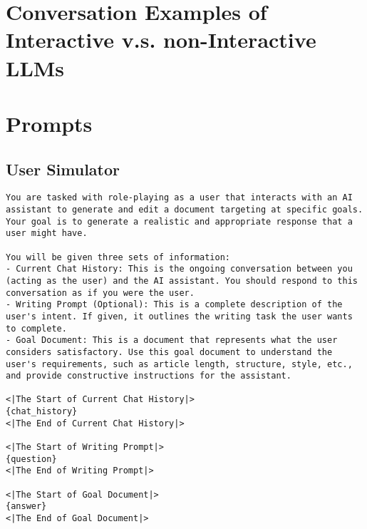 \newpage
\appendix
\section{Conversation Examples of Interactive v.s. non-Interactive LLMs}
\label{app:complex}

\section{Prompts}
\subsection{User Simulator}
\label{app:user_simulator}

\begin{lstlisting}
You are tasked with role-playing as a user that interacts with an AI assistant to generate and edit a document targeting at specific goals. Your goal is to generate a realistic and appropriate response that a user might have.

You will be given three sets of information:
- Current Chat History: This is the ongoing conversation between you (acting as the user) and the AI assistant. You should respond to this conversation as if you were the user.
- Writing Prompt (Optional): This is a complete description of the user's intent. If given, it outlines the writing task the user wants to complete.
- Goal Document: This is a document that represents what the user considers satisfactory. Use this goal document to understand the user's requirements, such as article length, structure, style, etc., and provide constructive instructions for the assistant.

<|The Start of Current Chat History|>
{chat_history}
<|The End of Current Chat History|>

<|The Start of Writing Prompt|>
{question}
<|The End of Writing Prompt|>

<|The Start of Goal Document|>
{answer}
<|The End of Goal Document|>


\end{lstlisting}

